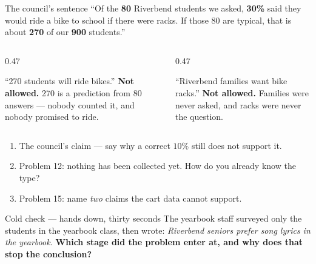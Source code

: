 \documentclass[aspectratio=169, 11pt]{beamer}
\newcommand{\redink}[1]{{\color{redacc}\bfseries #1}}
\begin{document}
\begin{frame}[t, plain]
  \vspace{4pt}
  \begin{block}{The council's sentence}
    ``Of the \textbf{80} Riverbend students we asked, \textbf{30\%} said they would ride a
    bike to school if there were racks. If those 80 are typical, that is about \textbf{270} of
    our \textbf{900} students.''
  \end{block}
  \vspace{8pt}
  \begin{columns}[t]
    \begin{column}{0.47\textwidth}
      \begin{block}{``270 students will ride bikes.''}
        \redink{Not allowed.} 270 is a prediction from 80 answers --- nobody counted it, and
        nobody promised to ride.
      \end{block}
    \end{column}
    \begin{column}{0.47\textwidth}
      \begin{block}{``Riverbend families want bike racks.''}
        \redink{Not allowed.} Families were never asked, and racks were never the question.
      \end{block}
    \end{column}
  \end{columns}
\end{frame}

\begin{frame}[t, plain]
  \vspace{4pt}
  \begin{enumerate}\setlength{\itemsep}{5pt}
    \item The council's claim --- say why a correct $10\%$ still does not support it.
    \item Problem 12: nothing has been collected yet. How do you already know the type?
    \item Problem 15: name \emph{two} claims the cart data cannot support.
  \end{enumerate}
  \vspace{6pt}
  \begin{block}{Cold check --- hands down, thirty seconds}
    The yearbook staff surveyed only the students in the yearbook class, then wrote:
    \emph{Riverbend seniors prefer song lyrics in the yearbook.} \textbf{Which stage did the
    problem enter at, and why does that stop the conclusion?}
  \end{block}
\end{frame}
\end{document}
